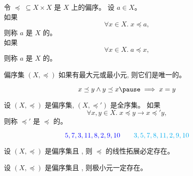 \begin{frame}{}
  \begin{definition}
    令 $\preceq \;\subseteq X \times X$ 是 $X$ 上的偏序。
    设 $a \in X$。\\[5pt]

    \pause
    如果
    \[
      \forall x \in X.\; x \preceq a,
    \]
    则称 $a$ 是 $X$ 的。\\[10pt]

    \pause
    如果
    \[
      \forall x \in X.\; a \preceq x,
    \]
    则称 $a$ 是 $X$ 的。
  \end{definition}

  \pause
  \vspace{0.30cm}
  \begin{center}
  \end{center}
\end{frame}

\begin{frame}{}
  \begin{theorem}
    偏序集 $(X, \preceq)$ 如果有最大元或最小元, 则它们是唯一的。
  \end{theorem}

  \pause
  \vspace{0.30cm}
  \begin{center}

    \pause
    \[
      x \preceq y \land y \preceq x \pause \implies x = y
    \]
  \end{center}
\end{frame}

\begin{frame}{}
  \begin{definition}
    设 $(X, \preceq)$ 是偏序集, $(X, \preceq')$ 是全序集。
    如果
    \[
      \forall x, y \in X.\; x \preceq y \to x \preceq' y,
    \]
    则称 $\preceq'$ 是 $\preceq$ 的。
  \end{definition}


  \pause
  \vspace{-0.50cm}
  \[
    \textcolor{blue}{5, 7, 3, 11, 8, 2, 9, 10} \qquad \textcolor{cyan}{3, 5, 7, 8, 11, 2, 9, 10}
  \]
\end{frame}

\begin{frame}{}
  \begin{theorem}
    设 $(X, \preceq)$ 是偏序集且 , 则 $\preceq$ 的线性拓展必定存在。
  \end{theorem}


  \pause
  \vspace{0.30cm}
  \begin{theorem}
    设 $(X, \preceq)$ 是偏序集且 , 则极小元一定存在。
  \end{theorem}
\end{frame}

